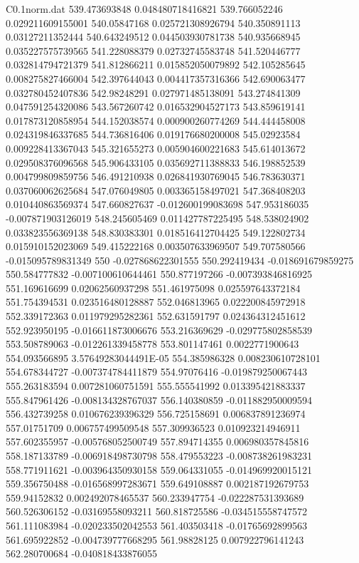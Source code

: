 \begin{filecontents}{C0.1norm.dat}
539.473693848		0.048480718416821
539.766052246		0.029211609155001
540.05847168		0.025721308926794
540.350891113		0.03127211352444
540.643249512		0.044503930781738
540.935668945		0.035227575739565
541.228088379		0.02732745583748
541.520446777		0.032814794721379
541.812866211		0.015852050079892
542.105285645		0.008275827466004
542.397644043		0.004417357316366
542.690063477		0.032780452407836
542.98248291		0.027971485138091
543.274841309		0.047591254320086
543.567260742		0.016532904527173
543.859619141		0.017873120858954
544.152038574		0.000900260774269
544.444458008		0.024319846337685
544.736816406		0.019176680200008
545.02923584		0.009228413367043
545.321655273		0.005904600221683
545.614013672		0.029508376096568
545.906433105		0.035692711388833
546.198852539		0.004799809859756
546.491210938		0.026841930769045
546.783630371		0.037060062625684
547.076049805		0.003365158497021
547.368408203		0.010440863569374
547.660827637		-0.012600199083698
547.953186035		-0.007871903126019
548.245605469		0.011427787225495
548.538024902		0.033823556369138
548.830383301		0.018516412704425
549.122802734		0.015910152023069
549.415222168		0.003507633969507
549.707580566		-0.015095789831349
550		-0.027868622301555
550.292419434		-0.018691679859275
550.584777832		-0.007100610644461
550.877197266		-0.007393846816925
551.169616699		0.02062560937298
551.461975098		0.025597643372184
551.754394531		0.023516480128887
552.046813965		0.022200845972918
552.339172363		0.011979295282361
552.631591797		0.024364312451612
552.923950195		-0.016611873006676
553.216369629		-0.029775802858539
553.508789063		-0.012261339458778
553.801147461		0.0022771900643
554.093566895		3.57649283044491E-05
554.385986328		0.008230610728101
554.678344727		-0.007374784411879
554.97076416		-0.019879250067443
555.263183594		0.007281060751591
555.555541992		0.013395421883337
555.847961426		-0.008134328767037
556.140380859		-0.011882950009594
556.432739258		0.010676239396329
556.725158691		0.006837891236974
557.01751709		0.006757499509548
557.309936523		0.010923214946911
557.602355957		-0.005768052500749
557.894714355		0.006980357845816
558.187133789		-0.006918498730798
558.479553223		-0.008738261983231
558.771911621		-0.003964350930158
559.064331055		-0.014969920015121
559.356750488		-0.016568997283671
559.649108887		0.002187192679753
559.94152832		0.002492078465537
560.233947754		-0.022287531393689
560.526306152		-0.03169558093211
560.818725586		-0.034515558747572
561.111083984		-0.020233502042553
561.403503418		-0.01765692899563
561.695922852		-0.004739777668295
561.98828125		0.007922796141243
562.280700684		-0.040818433876055

\end{filecontents}
